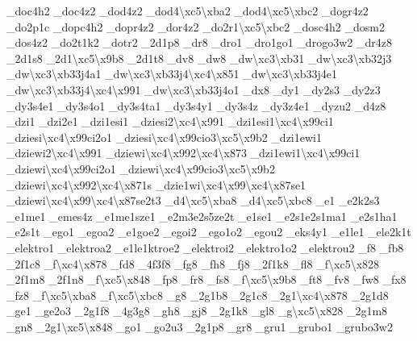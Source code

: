 {\-\_\-doc4h2 \-\_\-doc4z2 \-\_\-dod4z2 \-\_\-dod4\textbackslash{}xc5\textbackslash{}xba2 \-\_\-dod4\textbackslash{}xc5\textbackslash{}xbc2 \-\_\-dogr4z2 \-\_\-do2p1c \-\_\-dopc4h2 \-\_\-dopr4z2 \-\_\-dor4z2 \-\_\-do2r1\textbackslash{}xc5\textbackslash{}xbc2 \-\_\-dosc4h2 \-\_\-dosm2 \-\_\-dos4z2 \-\_\-do2t1k2 \-\_\-dotr2 \-\_\-2d1p8 \-\_\-dr8 \-\_\-dro1 \-\_\-dro1go1 \-\_\-drogo3w2 \-\_\-dr4z8 \-\_\-2d1s8 \-\_\-2d1\textbackslash{}xc5\textbackslash{}x9b8 \-\_\-2d1t8 \-\_\-dv8 \-\_\-dw8 \-\_\-dw\textbackslash{}xc3\textbackslash{}xb31 \-\_\-dw\textbackslash{}xc3\textbackslash{}xb32j3 \-\_\-dw\textbackslash{}xc3\textbackslash{}xb33j4a1 \-\_\-dw\textbackslash{}xc3\textbackslash{}xb33j4\textbackslash{}xc4\textbackslash{}x851 \-\_\-dw\textbackslash{}xc3\textbackslash{}xb33j4e1 \-\_\-dw\textbackslash{}xc3\textbackslash{}xb33j4\textbackslash{}xc4\textbackslash{}x991 \-\_\-dw\textbackslash{}xc3\textbackslash{}xb33j4o1 \-\_\-dx8 \-\_\-dy1 \-\_\-dy2s3 \-\_\-dy2z3 \-\_\-dy3s4e1 \-\_\-dy3s4o1 \-\_\-dy3s4ta1 \-\_\-dy3s4y1 \-\_\-dy3s4z \-\_\-dy3z4e1 \-\_\-dyzu2 \-\_\-d4z8 \-\_\-dzi1 \-\_\-dzi2e1 \-\_\-dzi1esi1 \-\_\-dziesi2\textbackslash{}xc4\textbackslash{}x991 \-\_\-dzi1esi1\textbackslash{}xc4\textbackslash{}x99ci1 \-\_\-dziesi\textbackslash{}xc4\textbackslash{}x99ci2o1 \-\_\-dziesi\textbackslash{}xc4\textbackslash{}x99cio3\textbackslash{}xc5\textbackslash{}x9b2 \-\_\-dzi1ewi1 \-\_\-dziewi2\textbackslash{}xc4\textbackslash{}x991 \-\_\-dziewi\textbackslash{}xc4\textbackslash{}x992\textbackslash{}xc4\textbackslash{}x873 \-\_\-dzi1ewi1\textbackslash{}xc4\textbackslash{}x99ci1 \-\_\-dziewi\textbackslash{}xc4\textbackslash{}x99ci2o1 \-\_\-dziewi\textbackslash{}xc4\textbackslash{}x99cio3\textbackslash{}xc5\textbackslash{}x9b2 \-\_\-dziewi\textbackslash{}xc4\textbackslash{}x992\textbackslash{}xc4\textbackslash{}x871s \-\_\-dzie1wi\textbackslash{}xc4\textbackslash{}x99\textbackslash{}xc4\textbackslash{}x87se1 \-\_\-dziewi\textbackslash{}xc4\textbackslash{}x99\textbackslash{}xc4\textbackslash{}x87se2t3 \-\_\-d4\textbackslash{}xc5\textbackslash{}xba8 \-\_\-d4\textbackslash{}xc5\textbackslash{}xbc8 \-\_\-e1 \-\_\-e2k2s3 \-\_\-e1me1 \-\_\-emes4z \-\_\-e1me1sze1 \-\_\-e2m3e2s5ze2t \-\_\-e1se1 \-\_\-e2s1e2s1ma1 \-\_\-e2s1ha1 \-\_\-e2s1t \-\_\-ego1 \-\_\-egoa2 \-\_\-e1goe2 \-\_\-egoi2 \-\_\-ego1o2 \-\_\-egou2 \-\_\-eks4y1 \-\_\-e1le1 \-\_\-ele2k1t \-\_\-elektro1 \-\_\-elektroa2 \-\_\-e1le1ktroe2 \-\_\-elektroi2 \-\_\-elektro1o2 \-\_\-elektrou2 \-\_\-f8 \-\_\-fb8 \-\_\-2f1c8 \-\_\-f\textbackslash{}xc4\textbackslash{}x878 \-\_\-fd8 \-\_\-4f3f8 \-\_\-fg8 \-\_\-fh8 \-\_\-fj8 \-\_\-2f1k8 \-\_\-fl8 \-\_\-f\textbackslash{}xc5\textbackslash{}x828 \-\_\-2f1m8 \-\_\-2f1n8 \-\_\-f\textbackslash{}xc5\textbackslash{}x848 \-\_\-fp8 \-\_\-fr8 \-\_\-fs8 \-\_\-f\textbackslash{}xc5\textbackslash{}x9b8 \-\_\-ft8 \-\_\-fv8 \-\_\-fw8 \-\_\-fx8 \-\_\-fz8 \-\_\-f\textbackslash{}xc5\textbackslash{}xba8 \-\_\-f\textbackslash{}xc5\textbackslash{}xbc8 \-\_\-g8 \-\_\-2g1b8 \-\_\-2g1c8 \-\_\-2g1\textbackslash{}xc4\textbackslash{}x878 \-\_\-2g1d8 \-\_\-ge1 \-\_\-ge2o3 \-\_\-2g1f8 \-\_\-4g3g8 \-\_\-gh8 \-\_\-gj8 \-\_\-2g1k8 \-\_\-gl8 \-\_\-g\textbackslash{}xc5\textbackslash{}x828 \-\_\-2g1m8 \-\_\-gn8 \-\_\-2g1\textbackslash{}xc5\textbackslash{}x848 \-\_\-go1 \-\_\-go2u3 \-\_\-2g1p8 \-\_\-gr8 \-\_\-gru1 \-\_\-grubo1 \-\_\-grubo3w2 }
